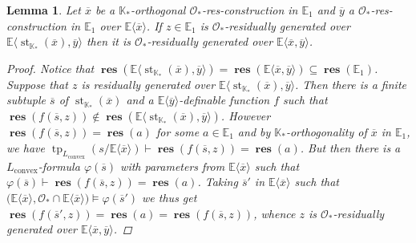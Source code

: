 \documentclass{amsart}
\newtheorem{lemma}[theorem]{Lemma}
\theoremstyle{remark}
\theoremstyle{definition}
\theoremstyle{plain}
\newcommand{\bE}{\mathbb E}
\newcommand{\bK}{\mathbb K}
\newcommand{\cO}{\mathcal O}
\newcommand{\convex}{\mathrm{convex}}
\DeclareMathOperator{\res}{\mathbf{res}}
\DeclareMathOperator{\std}{\mathrm{st}}
\DeclareMathOperator{\tp}{\mathrm{tp}}
\theoremstyle{plain}
\begin{document}
\begin{lemma}\label{lem:K_*orthogonal}
    Let $\overline{x}$ be a $\bK_*$-orthogonal $\cO_*$-res-construction in $\bE_1$ and $\overline{y}$ a $\cO_*$-res-construction in $\bE_1$ over $\bE \langle \overline{x} \rangle$. If $z\in \bE_1$ is $\cO_*$-residually generated over $\bE \langle \std_{\bK_*}(\overline{x}), \overline{y} \rangle$ then it is $\cO_*$-residually generated over $\bE \langle \overline{x}, \overline{y} \rangle$.
    \begin{proof}
        Notice that $\res(\bE \langle \std_{\bK_*}(\overline{x}), \overline{y}\rangle) = \res(\bE \langle \overline{x},\overline{y}\rangle)\subseteq \res(\bE_1)$.
        Suppose that $z$ is residually generated over $\bE \langle \std_{\bK_*}(\overline{x}), \overline{y}\rangle$. Then there is a finite subtuple $\overline{s}$ of $\std_{\bK_*}(\overline{x})$ and a $\bE\langle \overline{y} \rangle$-definable function $f$ such that $\res(f(\overline{s}, z)) \notin \res(\bE \langle \std_{\bK_*}(\overline{x}), \overline{y}\rangle)$.
        However $\res(f(\overline{s},z))=\res(a)$ for some $a \in \bE_1$ and by $\bK_*$-orthogonality of $\overline{x}$ in $\bE_1$, we have $\tp_{L_\convex}(s/\bE\langle \overline{x} \rangle) \vdash \res(f(\overline{s},z))=\res(a)$.
        But then there is a $L_\convex$-formula $\varphi(\overline{s})$ with parameters from $\bE \langle \overline{x}\rangle$ such that $\varphi(\overline{s})\vdash \res(f(\overline{s},z))=\res(a)$. Taking $\overline{s}'$ in $\bE \langle \overline{x} \rangle$ such that $\big(\bE \langle \overline{x} \rangle, \cO_* \cap \bE \langle \overline{x}\rangle\big) \models \varphi(\overline{s}')$ we thus get $\res(f(\overline{s}',z))=\res(a)=\res(f(\overline{s},z))$, whence $z$ is $\cO_*$-residually generated over $\bE \langle \overline{x}, \overline{y}\rangle$.
    \end{proof}
\end{lemma}
\end{document}
